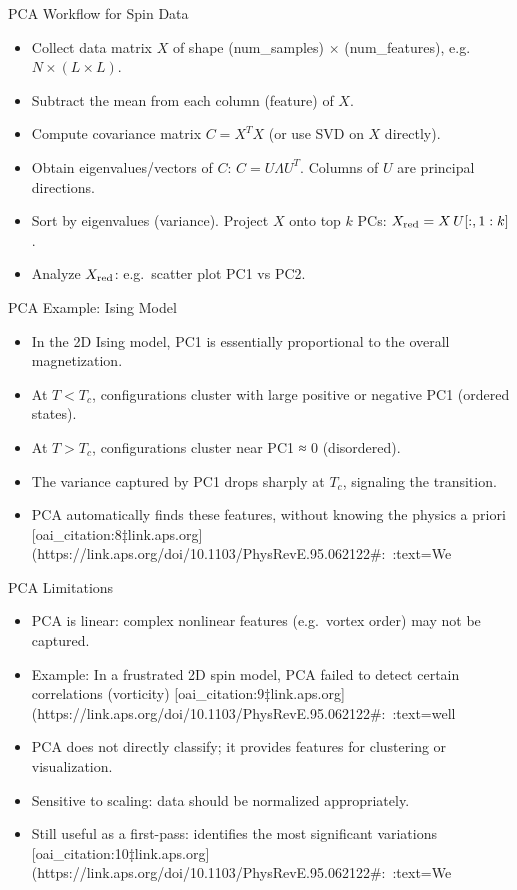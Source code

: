 \documentclass{beamer}
\begin{document}
\begin{frame}{PCA Workflow for Spin Data}
 \begin{itemize}
   \item Collect data matrix $X$ of shape (num\_samples) $\times$ (num\_features), e.g. $N\times (L\times L)$.
   \item Subtract the mean from each column (feature) of $X$.
   \item Compute covariance matrix $C = X^T X$ (or use SVD on $X$ directly).
   \item Obtain eigenvalues/vectors of $C$: $C = U \Lambda U^T$. Columns of $U$ are principal directions.
   \item Sort by eigenvalues (variance). Project $X$ onto top $k$ PCs: $X_{\rm red} = X\,U[:,1:k]$.
   \item Analyze $X_{\rm red}$: e.g.\ scatter plot PC1 vs PC2.
 \end{itemize}
\end{frame}

\begin{frame}{PCA Example: Ising Model}
 \begin{itemize}
   \item In the 2D Ising model, PC1 is essentially proportional to the overall magnetization.
   \item At $T < T_c$, configurations cluster with large positive or negative PC1 (ordered states).
   \item At $T > T_c$, configurations cluster near PC1 ≈ 0 (disordered).
   \item The variance captured by PC1 drops sharply at $T_c$, signaling the transition.
   \item PCA automatically finds these features, without knowing the physics a priori [oai_citation:8‡link.aps.org](https://link.aps.org/doi/10.1103/PhysRevE.95.062122#:~:text=We%
 \end{itemize}
\end{frame}

\begin{frame}{PCA Limitations}
 \begin{itemize}
   \item PCA is linear: complex nonlinear features (e.g.\ vortex order) may not be captured.
   \item Example: In a frustrated 2D spin model, PCA failed to detect certain correlations (vorticity) [oai_citation:9‡link.aps.org](https://link.aps.org/doi/10.1103/PhysRevE.95.062122#:~:text=well%
   \item PCA does not directly classify; it provides features for clustering or visualization.
   \item Sensitive to scaling: data should be normalized appropriately.
   \item Still useful as a first-pass: identifies the most significant variations [oai_citation:10‡link.aps.org](https://link.aps.org/doi/10.1103/PhysRevE.95.062122#:~:text=We%
 \end{itemize}
\end{frame}
\end{document}
